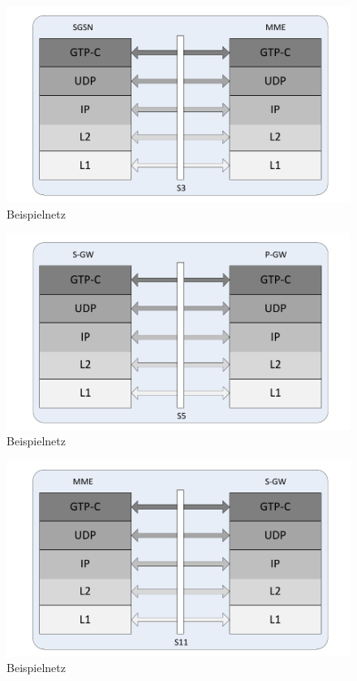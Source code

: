 \begin{figure}[htbp]
	 \centering
	 \includegraphics[width=1.0\textwidth]{images/3gpp/SGSN-MME-layers.pdf}
	 \caption{Beispielnetz}\label{fig:3gpp-sgsnmme}
\end{figure}

\begin{figure}[htbp]
	\centering
	\includegraphics[width=1.0\textwidth]{images/3gpp/S-GW-P-GW-layers.pdf}
	\caption{Beispielnetz}\label{fig:3gpp-sgwpgw}
\end{figure}

\begin{figure}[htbp]
	\centering
	\includegraphics[width=1.0\textwidth]{images/3gpp/MME-S-GW-layers.pdf}
	\caption{Beispielnetz}\label{fig:3gpp-mmesgw}
\end{figure}


